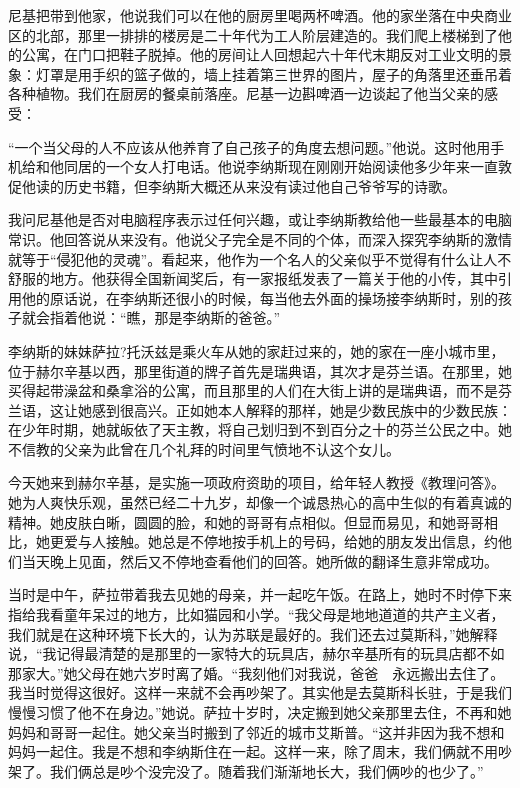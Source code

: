 尼基把带到他家，他说我们可以在他的厨房里喝两杯啤酒。他的家坐落在中央商业区的北部，那里一排排的楼房是二十年代为工人阶层建造的。我们爬上楼梯到了他的公寓，在门口把鞋子脱掉。他的房间让人回想起六十年代末期反对工业文明的景象：灯罩是用手织的篮子做的，墙上挂着第三世界的图片，屋子的角落里还垂吊着各种植物。我们在厨房的餐桌前落座。尼基一边斟啤酒一边谈起了他当父亲的感受：

“一个当父母的人不应该从他养育了自己孩子的角度去想问题。”他说。这时他用手机给和他同居的一个女人打电话。他说李纳斯现在刚刚开始阅读他多少年来一直敦促他读的历史书籍，但李纳斯大概还从来没有读过他自己爷爷写的诗歌。

我问尼基他是否对电脑程序表示过任何兴趣，或让李纳斯教给他一些最基本的电脑常识。他回答说从来没有。他说父子完全是不同的个体，而深入探究李纳斯的激情就等于“侵犯他的灵魂”。看起来，他作为一个名人的父亲似乎不觉得有什么让人不舒服的地方。他获得全国新闻奖后，有一家报纸发表了一篇关于他的小传，其中引用他的原话说，在李纳斯还很小的时候，每当他去外面的操场接李纳斯时，别的孩子就会指着他说：“瞧，那是李纳斯的爸爸。”

李纳斯的妹妹萨拉?托沃兹是乘火车从她的家赶过来的，她的家在一座小城市里，位于赫尔辛基以西，那里街道的牌子首先是瑞典语，其次才是芬兰语。在那里，她买得起带澡盆和桑拿浴的公寓，而且那里的人们在大街上讲的是瑞典语，而不是芬兰语，这让她感到很高兴。正如她本人解释的那样，她是少数民族中的少数民族：在少年时期，她就皈依了天主教，将自己划归到不到百分之十的芬兰公民之中。她不信教的父亲为此曾在几个礼拜的时间里气愤地不认这个女儿。

今天她来到赫尔辛基，是实施一项政府资助的项目，给年轻人教授《教理问答》。她为人爽快乐观，虽然已经二十九岁，却像一个诚恳热心的高中生似的有着真诚的精神。她皮肤白晰，圆圆的脸，和她的哥哥有点相似。但显而易见，和她哥哥相比，她更爱与人接触。她总是不停地按手机上的号码，给她的朋友发出信息，约他们当天晚上见面，然后又不停地查看他们的回答。她所做的翻译生意非常成功。

当时是中午，萨拉带着我去见她的母亲，并一起吃午饭。在路上，她时不时停下来指给我看童年呆过的地方，比如猫园和小学。“我父母是地地道道的共产主义者，我们就是在这种环境下长大的，认为苏联是最好的。我们还去过莫斯科，”她解释说，“我记得最清楚的是那里的一家特大的玩具店，赫尔辛基所有的玩具店都不如那家大。”她父母在她六岁时离了婚。“我刻他们对我说，爸爸　永远搬出去住了。我当时觉得这很好。这样一来就不会再吵架了。其实他是去莫斯科长驻，于是我们慢慢习惯了他不在身边。”她说。萨拉十岁时，决定搬到她父亲那里去住，不再和她妈妈和哥哥一起住。她父亲当时搬到了邻近的城市艾斯普。“这并非因为我不想和妈妈一起住。我是不想和李纳斯住在一起。这样一来，除了周末，我们俩就不用吵架了。我们俩总是吵个没完没了。随着我们渐渐地长大，我们俩吵的也少了。”

